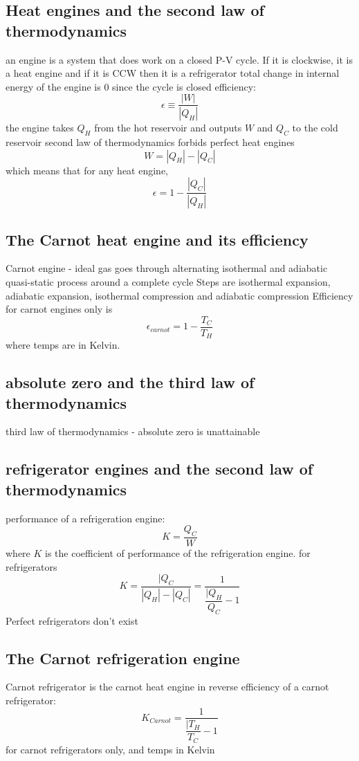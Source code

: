 \documentclass{article}
\begin{document}
\subsection{Heat engines and the second law of thermodynamics}
\begin{outline}
\1 an engine is a system that does work on a closed P-V cycle. If it is clockwise, it is a heat engine and if it is CCW then it is a refrigerator
\1 total change in internal energy of the engine is 0 since the cycle is closed
\1 efficiency: \[\epsilon\equiv\dfrac{|W|}{|Q_H|}\]
\1 the engine takes $Q_H$ from the hot reservoir and outputs $W$ and $Q_C$ to the cold reservoir
\1 second law of thermodynamics forbids perfect heat engines
\0 \[W=|Q_H|-|Q_C|\] which means that for any heat engine, \[\epsilon=1-\dfrac{|Q_C|}{|Q_H|}\]
\end{outline}
\subsection{The Carnot heat engine and its efficiency}
\begin{outline}
\1 Carnot engine - ideal gas goes through alternating isothermal and adiabatic quasi-static process around a complete cycle
\1 Steps are isothermal expansion, adiabatic expansion, isothermal compression and adiabatic compression
\1 Efficiency for carnot engines only is \[\epsilon_{carnot}=1-\dfrac{T_C}{T_H}\] where temps are in Kelvin. 
\end{outline}
\subsection{absolute zero and the third law of thermodynamics}
\begin{outline}
\1 third law of thermodynamics - absolute zero is unattainable
\end{outline}
\subsection{refrigerator engines and the second law of thermodynamics}
\begin{outline}
\1 performance of a refrigeration engine: \[K=\dfrac{Q_C}{W}\] where $K$ is the coefficient of performance of the refrigeration engine. 
\1 for refrigerators \[K=\dfrac{|Q_C}{|Q_H|-|Q_C|}=\dfrac{1}{\dfrac{|Q_H}{Q_C}-1}\]
\1 Perfect refrigerators don't exist
\end{outline}
\subsection{The Carnot refrigeration engine}
\begin{outline}
\1 Carnot refrigerator is the carnot heat engine in reverse
\1 efficiency of a carnot refrigerator: \[K_{Carnot}=\dfrac{1}{\dfrac{|T_H}{T_C}-1}\] for carnot refrigerators only, and temps in Kelvin
\end{outline}
\end{document}
